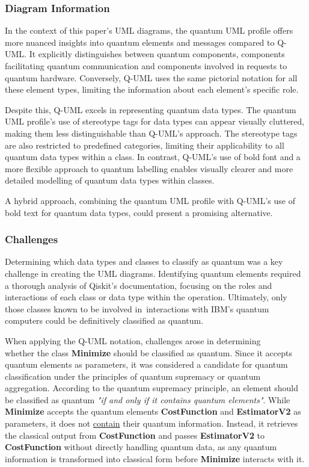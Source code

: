 \documentclass{article}
\begin{document}
\subsubsection{Diagram Information}

In the context of this paper's UML diagrams, the quantum UML profile offers more nuanced insights into quantum elements and messages compared to Q-UML. It explicitly distinguishes between quantum components, components facilitating quantum communication and components involved in requests to quantum hardware. Conversely, Q-UML uses the same pictorial notation for all these element types, limiting the information about each element's specific role.

Despite this, Q-UML excels in representing quantum data types. The quantum UML profile’s use of stereotype tags for data types can appear visually cluttered, making them less distinguishable than Q-UML’s approach. The stereotype tags are also restricted to predefined categories, limiting their applicability to all quantum data types within a class. In contrast, Q-UML's use of bold font and a more flexible approach to quantum labelling enables visually clearer and more detailed modelling of quantum data types within classes.

A hybrid approach, combining the quantum UML profile with Q-UML's use of bold text for quantum data types, could present a promising alternative.

\subsubsection{Challenges}

Determining which data types and classes to classify as quantum was a key challenge in creating the UML diagrams. Identifying quantum elements required a thorough analysis of Qiskit’s documentation, focusing on the roles and interactions of each class or data type within the operation. Ultimately, only those classes known to be involved in interactions with IBM's quantum computers could be definitively classified as quantum. 

When applying the Q-UML notation, challenges arose in determining\\ whether the class \textbf{Minimize} should be classified as quantum. Since it accepts quantum elements as parameters, it was considered a candidate for quantum classification under the principles of quantum supremacy or quantum aggregation. According to the quantum supremacy principle, an element should be classified as quantum \textit{"if and only if it contains quantum elements"}\cite{Pérez-Castillo2022}. While \textbf{Minimize} accepts the quantum elements \textbf{CostFunction} and \textbf{EstimatorV2} as parameters, it does not \underline{contain} their quantum information. Instead, it retrieves the classical output from \textbf{CostFunction} and passes \textbf{EstimatorV2} to \textbf{CostFunction} without directly handling quantum data, as any quantum information is transformed into classical form before \textbf{Minimize} interacts with it.
\end{document}
